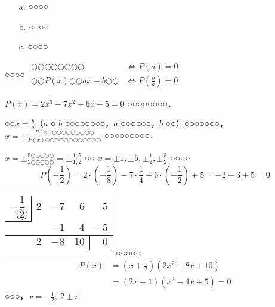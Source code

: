 \begin{enumerate}
\item[a.] ○○○○
\item[b.] ○○○○
\item[c.] ○○○○
\end{enumerate}
\begin{titlebox}{○○○○}
$\begin{array}{ll}
\text{○○○○○○○○}&\Longleftrightarrow P(a)=0\\
\text{○○$P(x)$○○$ax-b$○○}&\Longleftrightarrow P\left (\frac{b}{a}\right )=0
\end{array}$\\
\end{titlebox}
\begin{例}
$P(x)=2x^{3}-7x^{2}+6x+5=0$ ○○○○○○○○．
\end{例}
\begin{解}
○○$x=\frac{b}{a}$（$a$ ○ $b$ ○○○○○○○○，$a$ ○○○○○○，$b$ ○○）○○○○○○○，$x=\pm\frac{P(x)\text{○○○○○○○○○}}{P(x)\text{○○○○○○○○○○○○}}$ ○○○○○○○○○．

\noindent
$x=\pm\frac{\text{5○○○○○}}{\text{2○○○○○}} =\pm\frac{1,5}{1,2}$ ○○ $x=\pm 1, \pm 5, \pm\frac{1}{2}, \pm\frac{5}{2}$ ○○○○
\[
P\left (-\frac{1}{2}\right )=2\cdot\left (-\frac{1}{8}\right )-7\cdot\frac{1}{4}+6\cdot\left (-\frac{1}{2}\right )+5=-2-3+5=0
\]%
\begin{Mw}{40mm}{%
\includegraphics{./fig/fig00-step01}
}
○○○○○
\begin{align*}
P(x)&=\left (x+\frac{1}{2}\right )(2x^{2}-8x+10)\\
&=(2x+1)(x^{2}-4x+5)=0
\end{align*}
○○○，$x=-\frac{1}{2},\ 2\pm i$
\end{Mw}


\end{解}
